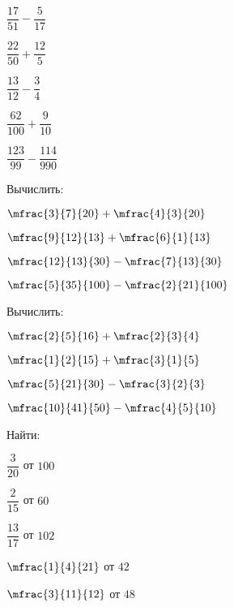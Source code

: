 \begin{class}[number=5]
\begin{listofex}
\begin{enumcols}[itemcolumns=4]
			\item \( \dfrac{17}{51}-\dfrac{5}{17} \)
			\item \( \dfrac{22}{50}+\dfrac{12}{5} \)
			\item \( \dfrac{13}{12}-\dfrac{3}{4} \)
			\item \( \dfrac{62}{100}+\dfrac{9}{10} \)
			\item \( \dfrac{123}{99}-\dfrac{114}{990} \)
		\end{enumcols}
		\item Вычислить:
		\begin{enumcols}[itemcolumns=4]
			\item \( \mfrac{3}{7}{20}+\mfrac{4}{3}{20} \)
			\item \( \mfrac{9}{12}{13}+\mfrac{6}{1}{13} \)
			\item \( \mfrac{12}{13}{30}-\mfrac{7}{13}{30} \)
			\item \( \mfrac{5}{35}{100}-\mfrac{2}{21}{100} \)
		\end{enumcols}
		\item Вычислить:
		\begin{enumcols}[itemcolumns=4]
			\item \( \mfrac{2}{5}{16}+\mfrac{2}{3}{4} \)
			\item \( \mfrac{1}{2}{15}+\mfrac{3}{1}{5} \)
			\item \( \mfrac{5}{21}{30}-\mfrac{3}{2}{3} \)
			\item \( \mfrac{10}{41}{50}-\mfrac{4}{5}{10} \)
		\end{enumcols}
		\item Найти:
		\begin{enumcols}[itemcolumns=5]
			\item \( \dfrac{3}{20} \) от \( 100 \)
			\item \( \dfrac{2}{15} \) от \( 60 \)
			\item \( \dfrac{13}{17} \) от \( 102 \)
			\item \( \mfrac{1}{4}{21} \) от \( 42 \)
			\item \( \mfrac{3}{11}{12} \) от \( 48 \)
		\end{enumcols}
	\end{listofex}
\end{class}
%	
%	
